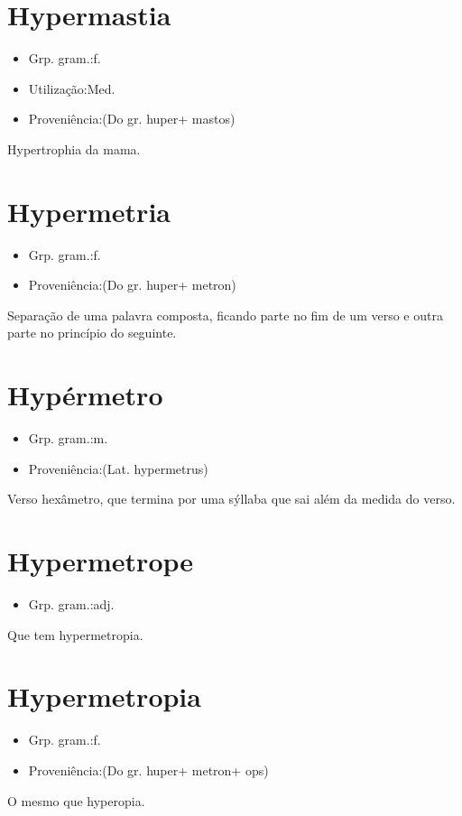 \documentclass{article}
\begin{document}
\section{Hypermastia}
\begin{itemize}
\item {Grp. gram.:f.}
\end{itemize}
\begin{itemize}
\item {Utilização:Med.}
\end{itemize}
\begin{itemize}
\item {Proveniência:(Do gr. \textunderscore huper\textunderscore  + \textunderscore mastos\textunderscore )}
\end{itemize}
Hypertrophia da mama.
\section{Hypermetria}
\begin{itemize}
\item {Grp. gram.:f.}
\end{itemize}
\begin{itemize}
\item {Proveniência:(Do gr. \textunderscore huper\textunderscore  + \textunderscore metron\textunderscore )}
\end{itemize}
Separação de uma palavra composta, ficando parte no fim de um verso e outra parte no princípio do seguinte.
\section{Hypérmetro}
\begin{itemize}
\item {Grp. gram.:m.}
\end{itemize}
\begin{itemize}
\item {Proveniência:(Lat. \textunderscore hypermetrus\textunderscore )}
\end{itemize}
Verso hexâmetro, que termina por uma sýllaba que sai além da medida do verso.
\section{Hypermetrope}
\begin{itemize}
\item {Grp. gram.:adj.}
\end{itemize}
Que tem hypermetropia.
\section{Hypermetropia}
\begin{itemize}
\item {Grp. gram.:f.}
\end{itemize}
\begin{itemize}
\item {Proveniência:(Do gr. \textunderscore huper\textunderscore  + \textunderscore metron\textunderscore  + \textunderscore ops\textunderscore )}
\end{itemize}
O mesmo que \textunderscore hyperopia\textunderscore .
\end{document}
